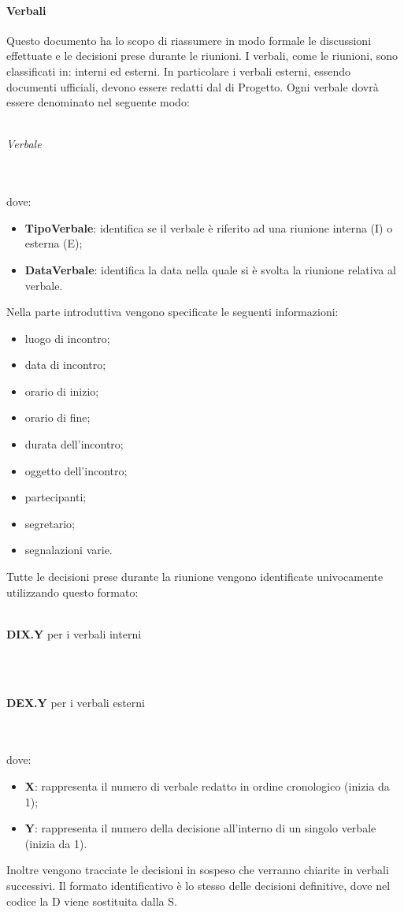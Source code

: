  \paragraph{Verbali}
Questo documento ha lo scopo di riassumere in modo formale le discussioni effettuate e le decisioni prese durante le riunioni. I verbali, come le riunioni, sono classificati in: interni ed esterni. In
particolare i verbali esterni, essendo documenti ufficiali, devono essere redatti dal \RESP{} di Progetto.
Ogni verbale dovrà essere denominato nel seguente modo:\\ \\
\centerline{\textit{Verbale}}
\\ \\
dove:
\begin{itemize}
	\item \textbf{TipoVerbale}: identifica se il verbale è riferito ad una riunione interna (I) o esterna (E);
	\item \textbf{DataVerbale}: identifica la data nella quale si è svolta la riunione relativa al verbale.
\end{itemize}
Nella parte introduttiva vengono specificate le seguenti informazioni:
\begin{itemize}
	\item luogo di incontro;
	\item data di incontro;
	\item orario di inizio;
	\item orario di fine;
	\item durata dell'incontro;
	\item oggetto dell'incontro;
	\item partecipanti;
	\item segretario;
	\item segnalazioni varie.
\end{itemize}
Tutte le decisioni prese durante la riunione vengono identificate univocamente utilizzando questo formato: \\ \\
\centerline{\textbf{DIX.Y} per i verbali interni}  \\ \\
\centerline{\textbf{DEX.Y} per i verbali esterni}  \\ \\
dove:
\begin{itemize}
	\item \textbf{X}: rappresenta il numero di verbale redatto in ordine cronologico (inizia da 1);
	\item \textbf{Y}: rappresenta il numero della decisione all'interno di un singolo verbale (inizia da 1).
\end{itemize}
Inoltre vengono tracciate le decisioni in sospeso che verranno chiarite in verbali successivi. Il formato identificativo è lo stesso delle decisioni definitive, dove nel codice la D viene sostituita dalla S.
